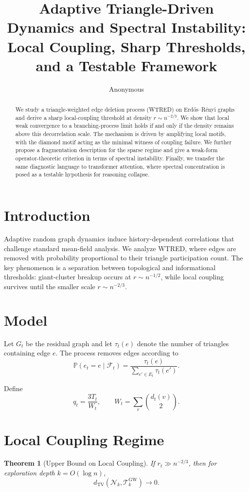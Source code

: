 \documentclass[11pt]{article}
\title{Adaptive Triangle-Driven Dynamics and Spectral Instability:\\
Local Coupling, Sharp Thresholds, and a Testable Framework}
\author{Anonymous}
\date{}
\newtheorem{theorem}{Theorem}
\begin{document}
\maketitle

\begin{abstract}
We study a triangle-weighted edge deletion process (WTRED) on Erd\H{o}s--R\'enyi graphs and derive a sharp local-coupling threshold at density $r \sim n^{-2/3}$. We show that local weak convergence to a branching-process limit holds if and only if the density remains above this decorrelation scale. The mechanism is driven by amplifying local motifs, with the diamond motif acting as the minimal witness of coupling failure. We further propose a fragmentation description for the sparse regime and give a weak-form operator-theoretic criterion in terms of spectral instability. Finally, we transfer the same diagnostic language to transformer attention, where spectral concentration is posed as a testable hypothesis for reasoning collapse.
\end{abstract}

\section{Introduction}
Adaptive random graph dynamics induce history-dependent correlations that challenge standard mean-field analysis. We analyze WTRED, where edges are removed with probability proportional to their triangle participation count. The key phenomenon is a separation between topological and informational thresholds: giant-cluster breakup occurs at $r \sim n^{-1/2}$, while local coupling survives until the smaller scale $r \sim n^{-2/3}$.

\section{Model}
Let $G_t$ be the residual graph and let $\tau_t(e)$ denote the number of triangles containing edge $e$. The process removes edges according to
\[
\mathbb P(e_t=e\mid \mathcal F_t)=\frac{\tau_t(e)}{\sum_{e'\in E_t}\tau_t(e')}.
\]

Define
\[
q_t=\frac{3T_t}{W_t}, \qquad W_t=\sum_v \binom{d_t(v)}{2}.
\]

\section{Local Coupling Regime}
\begin{theorem}[Upper Bound on Local Coupling]
If $r_t \gg n^{-2/3}$, then for exploration depth $k=O(\log n)$,
\[
d_{\mathrm{TV}}(\mathcal N_k,\mathcal T_k^{\mathrm{GW}})\to 0.
\]
\end{theorem}
\end{document}
